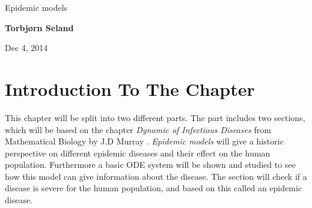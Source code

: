 \documentclass[%
twoside,                 %
final,                   %
10pt]{article}
\begin{document}




\thispagestyle{empty}

\begin{center}
{\LARGE\bf
\begin{spacing}{1.25}
Epidemic models
\end{spacing}
}
\end{center}


\begin{center}
{\bf Torbjørn Seland${}^{}$} \\ [0mm]
\end{center}

    \begin{center}
\end{center}


\begin{center}
Dec 4, 2014
\end{center}

\vspace{1cm}


\tableofcontents


\vspace{1cm} %



\newcommand{\Imax}{I_{\textrm{max}}}
\section{Introduction To The Chapter}
This chapter will be split into two different parts. The part includes two sections, which will be based on the chapter \emph{Dynamic of Infectious Diseases} from Mathematical Biology by J.D Murray \cite{murray2002mathematical}. \emph{Epidemic models} will give a historic perspective on different epidemic diseases and their effect on the human population. Furthermore a basic ODE system will be shown and studied to see how this model can give information about the disease. The section will check if a disease is severe for the human population, and based on this called an epidemic disease.


\vspace{3mm}
\end{document}
